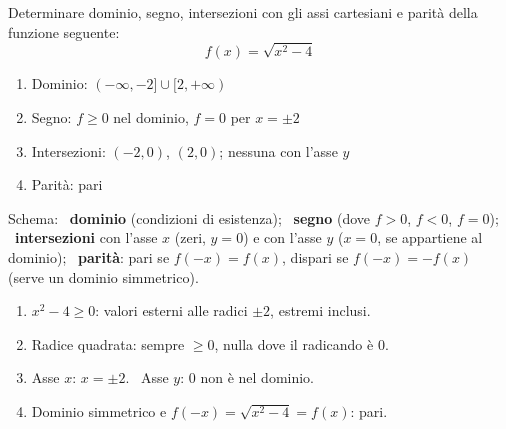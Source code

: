 \begin{question}[ID=1.10, subtitle={Studio di una funzione radicale pari}, difficulty=media, tags={funzioni, studio di funzione, radicali, parità}]
Determinare dominio, segno, intersezioni con gli assi cartesiani e parità della funzione seguente:
\begin{equation*}
    f(x)=\sqrt{x^2-4}
\end{equation*}
\begin{solution}
\begin{enumerate}
    \item Dominio: $(-\infty,-2]\cup[2,+\infty)$
    \item Segno: $f\geq0$ nel dominio, $f=0$ per $x=\pm2$
    \item Intersezioni: $(-2,0)$, $(2,0)$; nessuna con l'asse $y$
    \item Parità: pari
\end{enumerate}
\end{solution}
\begin{explanation}
Schema: \ \textbf{dominio} (condizioni di esistenza); \ \textbf{segno} (dove $f>0$, $f<0$, $f=0$); \ \textbf{intersezioni} con l'asse $x$ (zeri, $y=0$) e con l'asse $y$ ($x=0$, se appartiene al dominio); \ \textbf{parità}: pari se $f(-x)=f(x)$, dispari se $f(-x)=-f(x)$ (serve un dominio simmetrico).
\begin{enumerate}
    \item $x^2-4\geq0$: valori esterni alle radici $\pm2$, estremi inclusi.
    \item Radice quadrata: sempre $\geq0$, nulla dove il radicando è $0$.
    \item Asse $x$: $x=\pm2$. \ Asse $y$: $0$ non è nel dominio.
    \item Dominio simmetrico e $f(-x)=\sqrt{x^2-4}=f(x)$: pari.
\end{enumerate}
\end{explanation}
\end{question}



